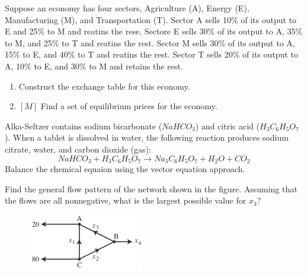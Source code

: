 \documentclass{../mathhomework}
\begin{document}
\maketitle

\pagebreak

\begin{problem}[1.6\#4]
    Suppose an economy has four sectors, Agriculture (A), Energy (E), Manufacturing (M), and Transportation (T). 
    Sector A sells 10\% of its output to E and 25\% to M and reatins the rese. Sectore E sells 30\% of its output
    to A, 35\% to M, and 25\% to T and reatins the rest. Sector M sells 30\% of its output to A, 15\% to E, and 40\%
    to T and reatins the rest. Sector T sells 20\% of its output to A, 10\% to E, and 30\% to M and retains the rest.
    \begin{enumerate}[label=\alph*.]
        \item Construct the exchange table for this economy.
        \item $[M]$ Find a set of equilibrium prices for the economy.
    \end{enumerate}
\end{problem}

\begin{problem}[1.6\#7]
    Alka-Seltzer contains sodium bicarbonate ($NaHCO_3$) and citric acid ($H_3C_6H_5O_7$). When a tablet is dissolved
    in water, the following reaction produces sodium citrate, water, and carbon dioxide (gas):
    \begin{equation*}
        NaHCO_3 + H_3C_6H_5O_7 \to Na_3C_6H_5O_7 + H_2O + CO_2
    \end{equation*}
    Balance the chemical equaion using the vector equation approach.
\end{problem}

\begin{problem}[1.6\#11]
    Find the general flow pattern of the network shown in the figure. Assuming that the flows are all nonnegative, what
    is the largest possible value for $x_3$?

    \begin{figure}[h!]
        \begin{center}
            \includegraphics[width=2in]{figures/1_6_11.png}
        \end{center}
    \end{figure}
\end{problem}
\end{document}
